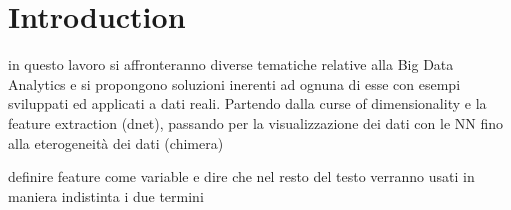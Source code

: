 \documentclass{standalone}
\begin{document}
\chapter*{Introduction}\label{Introduction}

in questo lavoro si affronteranno diverse tematiche relative alla Big Data Analytics e si propongono soluzioni inerenti ad ognuna di esse con esempi sviluppati ed applicati a dati reali.
Partendo dalla curse of dimensionality e la feature extraction (dnet), passando per la visualizzazione dei dati con le NN fino alla eterogeneità dei dati (chimera)

definire feature come variable e dire che nel resto del testo verranno usati in maniera indistinta i due termini
\end{document}
